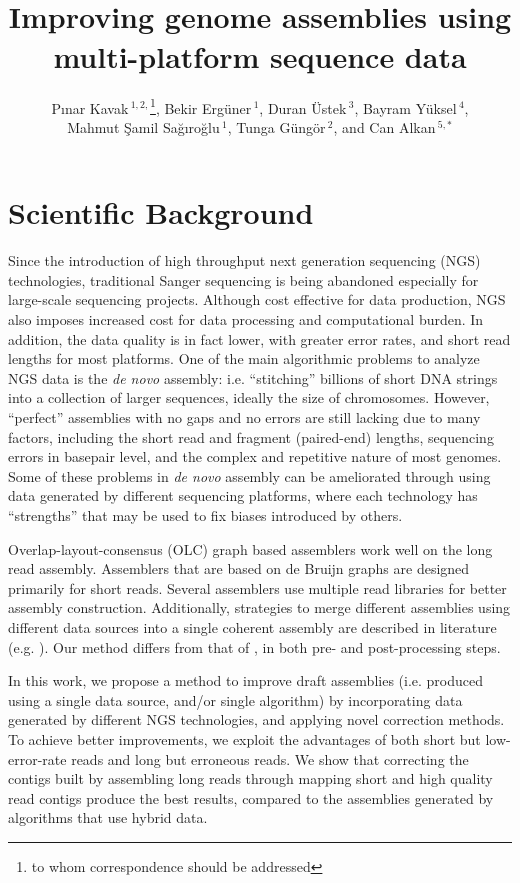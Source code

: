 \documentclass[12pt,a4paper]{cibb}
\title{\large $\ $\\ \bf Improving genome assemblies using multi-platform sequence data}
\author{ P\i nar Kavak\,$^{1,2,}$\footnote{to whom correspondence should be addressed},  Bekir Erg\"{u}ner\,$^{1}$,  Duran \"{U}stek\,$^{3}$,  Bayram Y\"{u}ksel\,$^{4}$, \\
  Mahmut \c{S}amil Sa\u{g}\i ro\u{g}lu\,$^1$, 
  Tunga G\"{u}ng\"{o}r\,$^{2}$, and 
  Can Alkan\,$^{5,*}$}
\begin{document}
\thispagestyle{myheadings}
\pagestyle{myheadings}

\section{\bf Scientific Background}

Since the introduction of high throughput next generation sequencing (NGS) technologies, traditional Sanger sequencing is being abandoned especially for large-scale sequencing projects.
Although cost effective for data production, NGS also imposes increased cost for data processing and computational burden. 
In addition, the data quality is in fact lower, with greater error rates, and short read lengths for most platforms. 
One of the main algorithmic problems to analyze NGS data is the \textit{de novo} assembly: i.e. ``stitching'' billions of short DNA strings into a collection of larger sequences, ideally the size of chromosomes. 
However, ``perfect'' assemblies with no gaps and no errors are still lacking due to many factors, including the short read and fragment (paired-end) lengths, sequencing errors in basepair level, and the complex and repetitive nature of most genomes. 
Some of these problems in \textit{de novo} assembly can be ameliorated through using data generated by different sequencing platforms, where each technology has ``strengths'' that may be used to fix biases introduced by others.

Overlap-layout-consensus (OLC) graph based assemblers \cite{celera:2000, sga:2012} work well on the long read assembly. Assemblers that are based on de Bruijn graphs \cite{velvetZerbino:2008, spadesBankevich:2012, allpaths:2008} are designed primarily for short reads. 
Several assemblers 
use multiple read libraries \cite{cabogMiller:2008, masurcaZimin:2013, mira} for better assembly construction. Additionally, strategies to merge different assemblies using different data sources into a single coherent assembly are described in literature (e.g. \cite{wang:2012}). Our method differs from that of \cite{wang:2012}, in both pre- and post-processing steps.

In this work, we propose a method to improve draft assemblies (i.e. produced using a single data source, and/or single algorithm) by incorporating data generated by different NGS technologies, and applying novel correction methods. To achieve better improvements, we exploit the advantages of both short but low-error-rate reads and long but erroneous reads. 
We show that correcting the contigs built by assembling long reads through mapping short and high quality read contigs produce the best results, compared to the assemblies generated by algorithms that use hybrid data.
\end{document}
